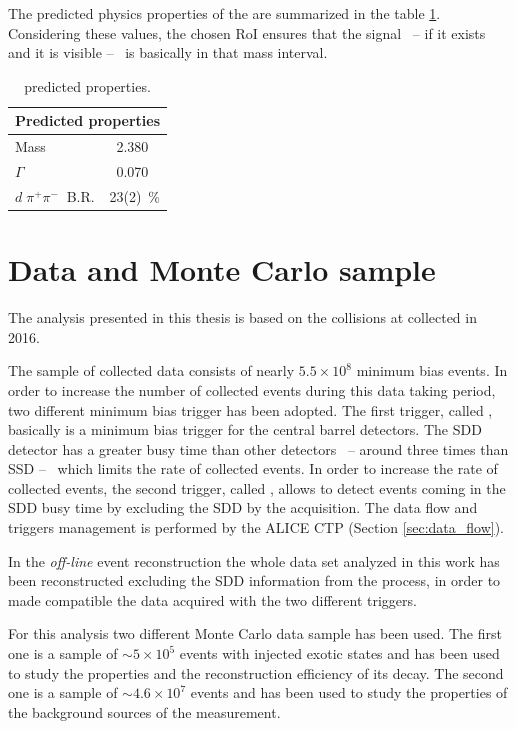 The predicted physics properties of the \dst are summarized in the table \ref{tab:dst_prop}. 
Considering these values, the chosen RoI ensures that the signal \ -- if it exists and it is visible
-- \ is basically in that mass interval.
\begingroup
\renewcommand{\arraystretch}{1.5} %
\begin{table}
\centering
\captionsetup{justification=centering}
\begin{tabular}{lr}
\multicolumn{2}{c}{\textbf{Predicted properties}}      \\
\toprule
Mass				             & 2.380 \ \gevcs 	    \\
$\Gamma$			        	 & 0.070 \ \gevcs 	   	\\
$d\; \pi^{+} \pi^{-}\ $ B.R.	 & 23(2)\ \%		    \\
\midrule
\end{tabular}
\caption{\dst predicted properties.}
\label{tab:dst_prop}
\end{table}
\endgroup

%
%
\section{Data and Monte Carlo sample} \label{sec:4.2}

The analysis presented in this thesis is based on the \pPb collisions at \sctev 
collected in 2016. 

The sample of collected data consists of nearly $5.5\times10^{8}$ minimum bias events.
In order to increase the number of collected events during this data taking period, two
different minimum bias trigger has been adopted.
The first trigger, called , basically is a minimum bias trigger for the central barrel
detectors. The SDD detector has a greater busy time than other detectors \ -- around three times
than SSD -- \ which limits the rate of collected events. 
In order to increase the rate of collected events, the second trigger, called , allows
to detect events coming in the SDD busy time by excluding the SDD by the acquisition.
The data flow and triggers management is performed by the ALICE CTP (Section \ref{sec:data_flow}).

In the \textit{off-line} event reconstruction the whole data set analyzed in this work has been
reconstructed excluding the SDD information from the process, in order to made compatible
the data acquired with the two different triggers.

For this analysis two different Monte Carlo data sample has been used.
The first one is a sample of $\sim 5 \times 10^{5}$ \pPb events with injected exotic states
and has been used to study the \dst properties and the reconstruction efficiency of its decay.
The second one is a sample of $\sim 4.6 \times 10^{7}$ \pPb events and has been used to study 
the properties of the background sources of the measurement.

